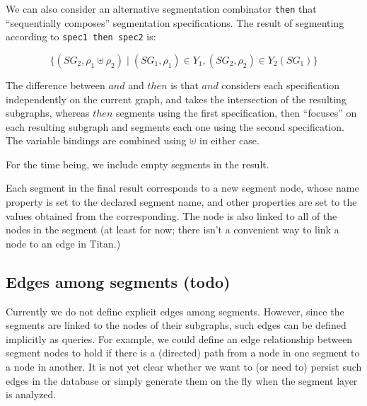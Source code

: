 \documentclass{article}
\begin{document}
We can also consider an alternative segmentation combinator
\verb|then| that ``sequentially composes'' segmentation
specifications.  The result of segmenting according to
\verb|spec1 then spec2| is:

\[\{(SG_2, \rho_1 \uplus \rho_2)  \mid (SG_1,\rho_1) \in
Y_1, (SG_2,\rho_2) \in Y_2(SG_1)\}\]

The difference between $and$ and $then$ is that $and$ considers each
specification independently on the
current graph, and takes the intersection of the resulting subgraphs, whereas $then$ segments using the first specification,
then ``focuses'' on each resulting subgraph and segments each one
using the second specification.  The variable bindings are combined
using $\uplus$ in either case.

For the time being, we include empty segments in the result.

Each segment in the final result corresponds to a new segment node,
whose name property is set to the declared segment name, and other
properties are set to the values obtained from the corresponding.  The
node is also linked to all of the nodes in the segment (at least for
now; there isn't a convenient way to link a node to an edge in Titan.)

\subsection{Edges among segments (todo)}

Currently we do not define explicit edges among segments.  However,
since the segments are linked to the nodes of their subgraphs, such
edges can be defined implicitly as queries.  For example, we could
define an edge relationship between segment nodes to hold if there is
a (directed) path from a node in one segment to a node in another.
It is not yet clear whether we want to (or need to) persist such edges
in the database or simply generate them on the fly when the segment
layer is analyzed.



\end{document}

